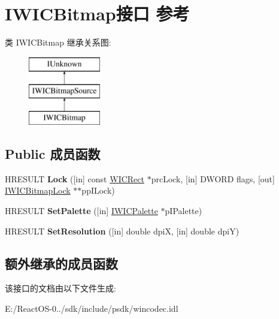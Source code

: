 \hypertarget{interface_i_w_i_c_bitmap}{}\section{I\+W\+I\+C\+Bitmap接口 参考}
\label{interface_i_w_i_c_bitmap}
类 I\+W\+I\+C\+Bitmap 继承关系图\+:\begin{figure}[H]
\begin{center}
\leavevmode
\includegraphics[height=3.000000cm]{interface_i_w_i_c_bitmap}
\end{center}
\end{figure}
\subsection*{Public 成员函数}
\begin{DoxyCompactItemize}
\item 
\mbox{\label{interface_i_w_i_c_bitmap_a57a0e72d0d2136fad1890017c8abf5e1}} 
H\+R\+E\+S\+U\+LT {\bfseries Lock} (\mbox{[}in\mbox{]} const \hyperlink{struct_w_i_c_rect}{W\+I\+C\+Rect} $\ast$prc\+Lock, \mbox{[}in\mbox{]} D\+W\+O\+RD flags, \mbox{[}out\mbox{]} \hyperlink{interface_i_w_i_c_bitmap_lock}{I\+W\+I\+C\+Bitmap\+Lock} $\ast$$\ast$pp\+I\+Lock)
\item 
\mbox{\label{interface_i_w_i_c_bitmap_a457ebe57bc6f1ba3ffed049165e37259}} 
H\+R\+E\+S\+U\+LT {\bfseries Set\+Palette} (\mbox{[}in\mbox{]} \hyperlink{interface_i_w_i_c_palette}{I\+W\+I\+C\+Palette} $\ast$p\+I\+Palette)
\item 
\mbox{\label{interface_i_w_i_c_bitmap_a078fc136a6d63cc7453aabdcd3c31477}} 
H\+R\+E\+S\+U\+LT {\bfseries Set\+Resolution} (\mbox{[}in\mbox{]} double dpiX, \mbox{[}in\mbox{]} double dpiY)
\end{DoxyCompactItemize}
\subsection*{额外继承的成员函数}


该接口的文档由以下文件生成\+:\begin{DoxyCompactItemize}
\item 
E\+:/\+React\+O\+S-\/0../sdk/include/psdk/wincodec.\+idl\end{DoxyCompactItemize}
